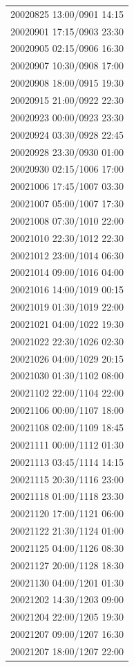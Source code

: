\documentclass[draft]{agujournal2019}
\begin{document}
\begin{center}
\begin{longtable}{c}
20020825 13:00/0901 14:15 \\ 
20020901 17:15/0903 23:30 \\ 
20020905 02:15/0906 16:30 \\ 
20020907 10:30/0908 17:00 \\ 
20020908 18:00/0915 19:30 \\ 
20020915 21:00/0922 22:30 \\ 
20020923 00:00/0923 23:30 \\
20020924 03:30/0928 22:45 \\ 
20020928 23:30/0930 01:00 \\
20020930 02:15/1006 17:00 \\ 
20021006 17:45/1007 03:30 \\
20021007 05:00/1007 17:30 \\
20021008 07:30/1010 22:00 \\ 
20021010 22:30/1012 22:30 \\
20021012 23:00/1014 06:30 \\
20021014 09:00/1016 04:00 \\ 
20021016 14:00/1019 00:15 \\ 
20021019 01:30/1019 22:00 \\
20021021 04:00/1022 19:30 \\
20021022 22:30/1026 02:30 \\
20021026 04:00/1029 20:15 \\
20021030 01:30/1102 08:00 \\
20021102 22:00/1104 22:00 \\
20021106 00:00/1107 18:00 \\
20021108 02:00/1109 18:45 \\
20021111 00:00/1112 01:30 \\
20021113 03:45/1114 14:15 \\
20021115 20:30/1116 23:00 \\
20021118 01:00/1118 23:30 \\
20021120 17:00/1121 06:00 \\
20021122 21:30/1124 01:00 \\
20021125 04:00/1126 08:30 \\
20021127 20:00/1128 18:30 \\
20021130 04:00/1201 01:30 \\
20021202 14:30/1203 09:00 \\
20021204 22:00/1205 19:30 \\
20021207 09:00/1207 16:30 \\
20021207 18:00/1207 22:00 \\

\end{longtable}
\end{center}
\end{document}
